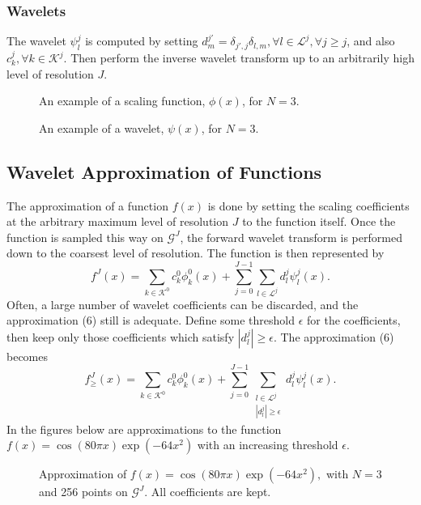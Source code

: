 \documentclass[11pt]{article}
\begin{document}
\subsubsection{Wavelets}
The wavelet $\psi_{l}^{j}$ is computed by setting $d_{m}^{j'} = \delta_{j',j} \delta_{l,m}, \forall l \in \mathcal{L}^{j}, \forall j \geq j$, and also $c_{k}^{j}, \forall k \in \mathcal{K}^j$. Then perform the inverse wavelet transform up to an arbitrarily high level of resolution $J$.

\begin{figure}
	\center
	
	\caption{An example of a scaling function, $\phi(x)$, for $N=3$.}
\end{figure}
\begin{figure}
	\center
	
	\caption{An example of a wavelet, $\psi(x)$, for $N=3$.}
\end{figure}
\subsection{Wavelet Approximation of Functions}
The approximation of a function $f(x)$ is done by setting the scaling coefficients at the arbitrary maximum level of resolution $J$ to the function itself. Once the function is sampled this way on $\mathcal{G}^J$, the forward wavelet transform is 
performed down to the coarsest level of resolution. The function is then represented by 
\begin{equation}
        f^J(x)=\sum_{k \in \mathcal{K}^0} c_{k}^{0} \phi_{k}^{0}(x) + \sum_{j=0}^{J-1} \sum_{l \in \mathcal{L}^j}
                d_{l}^{j} \psi_{l}^{j}(x).
\end{equation}
Often, a large number of wavelet coefficients can be discarded, and the approximation (6) still is adequate. Define some threshold $\epsilon$ for the coefficients, then keep only those coefficients which satisfy $|d_{l}^{j}| \geq \epsilon$. The approximation (6) becomes 
\begin{equation}
        f_{\geq}^{J}(x)=\sum_{k \in \mathcal{K}^0} c_{k}^{0} \phi_{k}^{0}(x) + \sum_{j=0}^{J-1} \sum_{ \substack{ l \in \mathcal{L}^j \\ |d_{l}^{j}| \geq \epsilon} } d_{l}^{j} \psi_{l}^{j}(x).
\end{equation}
In the figures below are approximations to the function $f(x)=\cos{(80 \pi x)} \exp{(-64 x^2)}$ with an increasing threshold 
$\epsilon$.
\begin{figure}[H]
	\center
	
	\caption{Approximation of $f(x)=\cos{(80 \pi x)} \exp{(-64 x^2)},$ with $N=3$ and 256 points on $\mathcal{G}^J$. All coefficients are kept.}
\end{figure}
\end{document}
